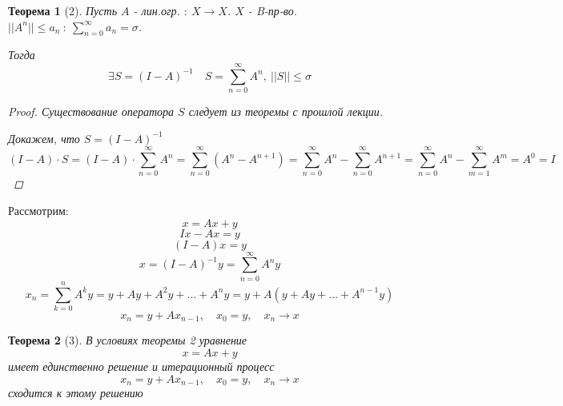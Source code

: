 \documentclass[a4paper]{article}
\newtheorem*{theorem}{Теорема}
\theoremstyle{definition}
\theoremstyle{remark}
\begin{document}
\begin{tcolorbox}
\begin{theorem}[2]
    Пусть $ A $ - лин.огр. $ : \ X \to X $. $ X $ - B-пр-во.\\
    $ ||A^n|| \leq a_n \ : \ \sum_{n=0}^{\infty} a_n = \sigma $. 

    Тогда
    \[
        \exists S = (I - A)^{-1} \quad S = \sum_{n=0}^{\infty} A^n, \ 
        ||S|| \leq \sigma
    \]

    \begin{proof}
        Существование оператора $ S $ следует из теоремы с прошлой лекции.

        Докажем, что $ S = (I - A)^{-1} $ 
        \[
            (I-A) \cdot S = (I - A) \cdot \sum_{n=0}^{\infty} A^n
            = \sum_{n=0}^{\infty} (A^n - A^{n+1}) = \sum_{n=0}^{\infty} A^n
            - \sum_{n=0}^{\infty} A^{n+1} = 
            \sum_{n=0}^{\infty} A^n - \sum_{m=1}^{\infty} A^m = A^0 = I
        \]
    \end{proof}
\end{theorem}
\end{tcolorbox}

Рассмотрим:
\[
    x = Ax + y
\]
\[
    Ix - Ax = y
\]
\[
    (I-A) x = y
\]
\[
    x = (I-A)^{-1} y = \sum_{n=0}^{\infty} A^n y
\]
\[
    x_n = \sum_{k=0}^{n} A^k y = y + Ay + A^2 y + \dots + A^n y
    = y + A(y + Ay + \dots + A^{n-1}y)
\]
\[
    x_n = y + Ax_{n-1}, \quad x_0 = y, \quad x_n \to x
\]

\begin{tcolorbox}
\begin{theorem}[3]
    В условиях теоремы 2 уравнение
    \[
        x = Ax + y
    \]
    имеет единственно решение и итерационный процесс
    \[
        x_n = y + Ax_{n-1}, \quad x_0 = y, \quad x_n \to x
    \]
    сходится к этому решению
\end{theorem}
\end{tcolorbox}
\end{document}
